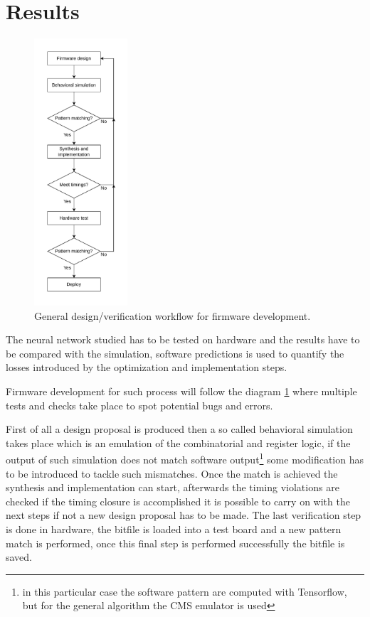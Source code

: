 \documentclass[../../main.tex]{subfiles}
\begin{document}
\section{Results}
\label{sec:P2GT_Res}

\begin{figure}
    \centering
    \includegraphics[width=0.31\textwidth]{sections/05/Images/FPGA_workflow.pdf}
    \caption{General design/verification workflow for firmware development.}
    \label{fig:FW_diag}
\end{figure}
The neural network studied has to be tested on hardware and the results have to be compared with the simulation, software predictions is used to quantify the losses introduced by the optimization and implementation steps.  

Firmware development for such process will follow the diagram \ref{fig:FW_diag} where multiple tests and checks take place to spot potential bugs and errors.  


First of all a design proposal is produced then a so called behavioral simulation takes place which is an emulation of the combinatorial and register logic, if the output of such simulation does not match software output\footnote{in this particular case the software pattern are computed with Tensorflow, but for the general algorithm the CMS emulator is used} some modification has to be introduced to tackle such mismatches.  
Once the match is achieved the synthesis and implementation can start, afterwards the timing violations are checked if the timing closure is accomplished it is possible to carry on with the next steps if not a new design proposal has to be made.
The last verification step is done in hardware, the bitfile is loaded into a test board and a new pattern match is performed, once this final step is performed successfully the bitfile is saved.  
\end{document}
